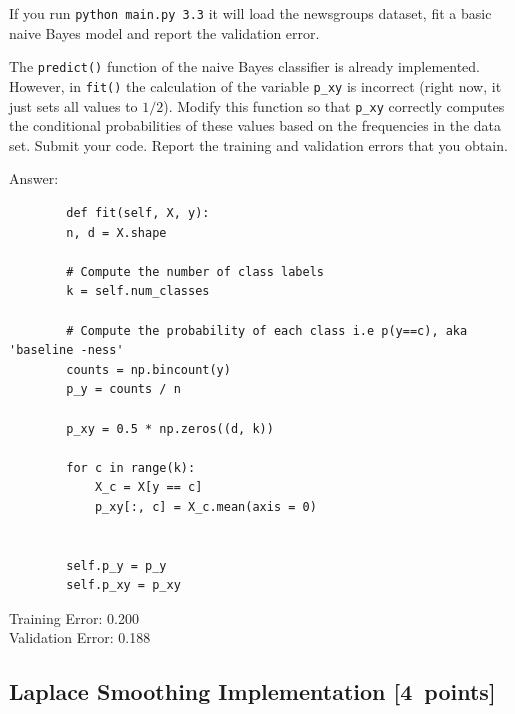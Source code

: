 \documentclass{article}
\newcommand{\blu}[1]{{\textcolor{blu}{#1}}}
\newenvironment{answer}{\par\begingroup\color{gre}Answer: }{\endgroup}
\let\ask\blu
\newcommand\pts[1]{\textcolor{pointscolour}{[#1~points]}}
\begin{document}
    If you run \texttt{python main.py 3.3}
    it will load the newsgroups dataset, fit a basic naive Bayes model and report the validation error.

    The \texttt{predict()} function of the naive Bayes classifier is already implemented.
    However, in \texttt{fit()}
    the calculation of the variable \texttt{p\_xy} is incorrect
    (right now, it just sets all values to $1/2$).
    \ask{Modify this function so that \texttt{p\_xy} correctly
        computes the conditional probabilities of these values based on the
        frequencies in the data set. Submit your code. Report the training and validation errors that you obtain.}

    \begin{answer}
    \begin{lstlisting}
        def fit(self, X, y):
        n, d = X.shape

        # Compute the number of class labels
        k = self.num_classes

        # Compute the probability of each class i.e p(y==c), aka 'baseline -ness'
        counts = np.bincount(y)
        p_y = counts / n

        p_xy = 0.5 * np.zeros((d, k))

        for c in range(k):
            X_c = X[y == c]
            p_xy[:, c] = X_c.mean(axis = 0)


        self.p_y = p_y
        self.p_xy = p_xy
    \end{lstlisting}
    Training Error: 0.200 \\
    Validation Error: 0.188
    \end{answer}

    \clearpage
    \subsection{Laplace Smoothing Implementation \pts{4}}
\end{document}
